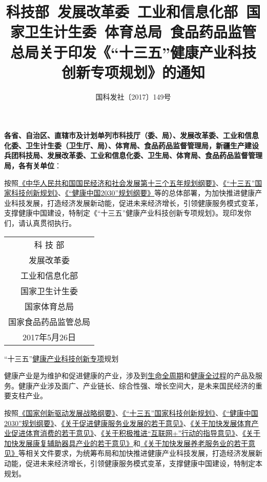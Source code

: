 \documentclass{article}
\title{科技部\ 发展改革委\ 工业和信息化部\ 国家卫生计生委\ 体育总局\ 食品药品监管总局关于印发《“十三五”健康产业科技创新专项规划》的通知}
\author{国科发社〔2017〕149号}
\begin{document}
	
\maketitle

\noindent \textbf{各省、自治区、直辖市及计划单列市科技厅（委、局）、发展改革委、工业和信息化委、卫生计生委（卫生厅、局）、体育局、食品药品监督管理局，新疆生产建设兵团科技局、发展改革委、工业和信息化委、卫生局、体育局、食品药品监督管理局，各有关单位}：

\vspace{0.2in} 

按照\uline{《中华人民共和国国民经济和社会发展第十三个五年规划纲要》}、\uline{《“十三五”国家科技创新规划》}、\uline{《“健康中国2030”规划纲要》}等的总体部署，为加快推进健康产业科技发展，打造经济发展新动能，促进未来经济增长，引领健康服务模式变革，支撑健康中国建设，特制定《“十三五”健康产业科技创新专项规划》。现印发你们，请认真贯彻执行。

\vspace{0.2in} 

\begin{flushright}
	\begin{tabular}{c}
		科 技 部 \\
		发展改革委 \\
		工业和信息化部 \\
		国家卫生计生委 \\
		国家体育总局 \\
		国家食品药品监管总局 \\
		2017年5月26日 
	\end{tabular}
	
\end{flushright}

\newpage
\tableofcontents
\newpage


\vspace{0.5in} 
{\noindent \Huge \centerline{“十三五”\uline{健康产业科技创新专项}规划}}
\vspace{0.5em} 

健康产业是为维护和促进健康的产业，涉及到\uline{生命全周期}和\uline{健康全过程}的产品及服务。健康产业涉及面广、产业链长、综合性强、增长空间大，是未来国民经济的重要支柱产业。

按照\uline{《国家创新驱动发展战略纲要》}、\uline{《“十三五”国家科技创新规划》}、\uline{《“健康中国2030”规划纲要》}、\uline{《关于促进健康服务业发展的若干意见》}、\uline{《关于加快发展体育产业促进体育消费的若干意见》}、\uline{《关于积极推进“互联网+”行动的指导意见》}、\uline{《关于加快发展康复辅助器具产业的若干意见》}和\uline{《关于加快发展养老服务业的若干意见》}等相关文件要求，为统筹布局和加快推进健康产业科技发展，打造经济发展新动能，促进未来经济增长，引领健康服务模式变革，支撑健康中国建设，特制定本规划。
\end{document}
